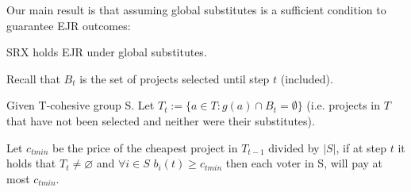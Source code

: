 \documentclass[runningheads]{llncs}
\newcommand{\kibitz}[2]{\ifnum\Comments=1{\color{#1}{#2}}\fi}
\newcommand{\rf}[1]{\kibitz{blue}{[Roy says:#1]}}
\begin{document}


Our main result is that assuming global substitutes is a sufficient condition to guarantee EJR outcomes:
\begin{theorem}\label{theorem:ejr}
SRX holds EJR under global substitutes.
\end{theorem}

Recall that $B_t$ is the set of projects selected until step $t$ (included).


\begin{lemma}\label{lemma:substitutes}
Given T-cohesive group S.  Let $T_t:=\{a\in T: g(a)\cap B_t = \emptyset\}$ (i.e. projects in $T$ that have not been selected and neither were their substitutes).




Let $c_{tmin}$ be the price of the cheapest project in $T_{t-1}$ divided by $|S|$,
if at step $t$ it holds that $T_t\neq\varnothing$ and $\forall i\in S$ $b_i(t)\geq c_{tmin}$ then each voter in S, will pay at most $c_{tmin}$.

\end{lemma}
\end{document}
